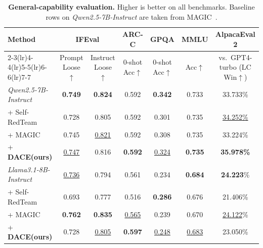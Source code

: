 \documentclass{article}
\newcommand{\method}{\textsc{DACE}\xspace}
\begin{document}
\begin{table}[t]
\centering
\caption{\textbf{General-capability evaluation.} Higher is better on all benchmarks. Baseline rows on \textit{Qwen2.5-7B-Instruct} are taken from MAGIC~\citep{magic2025}.}
\label{tab:general_cap}
\setlength{\tabcolsep}{4pt}
\renewcommand{\arraystretch}{1.12}
\scriptsize
\begin{tabular}{lcccccc}
\toprule
Method & \multicolumn{2}{c}{IFEval} & ARC-C & GPQA & MMLU & AlpacaEval 2 \\
\cmidrule(lr){2-3}\cmidrule(lr){4-4}\cmidrule(lr){5-5}\cmidrule(lr){6-6}\cmidrule(lr){7-7}
& Prompt Loose$\uparrow$ & Instruct Loose$\uparrow$ & 0-shot Acc$\uparrow$ & 0-shot Acc$\uparrow$ & Acc$\uparrow$ & vs.\ GPT4-turbo (LC Win$\uparrow$) \\
\midrule
\textit{Qwen2.5-7B-Instruct} & \textbf{0.749} & \textbf{0.824} & 0.592 & \textbf{0.342} & 0.733 & 33.733\% \\
\quad + Self-RedTeam & 0.728 & 0.805 & 0.592 & 0.301 & 0.735 & \underline{34.252\%} \\
\quad + MAGIC        & 0.745 & \underline{0.821} & 0.592 & 0.308 & 0.735 & 33.224\% \\
\cellcolor{cyan!15}\quad + \textbf{\method (ours)} & \cellcolor{cyan!15}\underline{0.747} & \cellcolor{cyan!15}0.816 & \cellcolor{cyan!15}\textbf{0.592} & \cellcolor{cyan!15}\underline{0.324} & \cellcolor{cyan!15}\textbf{0.735} & \cellcolor{cyan!15}\textbf{35.978\%} \\
\addlinespace[0.35em]
\textit{Llama3.1-8B-Instruct} & \underline{0.736} & 0.794 & 0.561 & 0.234 & \textbf{0.684} & \textbf{24.223}\% \\
\quad + Self-RedTeam & 0.693 & 0.777 & 0.516 & \textbf{0.286} & 0.676 & 21.406\% \\
\quad + MAGIC        & \textbf{0.762} & \textbf{0.835} & \underline{0.565} & 0.239 & 0.670 & \underline{24.122}\% \\
\cellcolor{cyan!15}\quad + \textbf{\method (ours)} & \cellcolor{cyan!15}0.728 & \cellcolor{cyan!15}\underline{0.805} & \cellcolor{cyan!15}\textbf{0.597} & \cellcolor{cyan!15}\underline{0.248} & \cellcolor{cyan!15}\underline{0.683} & \cellcolor{cyan!15}23.050\% \\
\bottomrule
\end{tabular}
\end{table}
\end{document}
